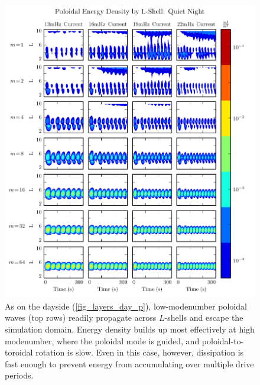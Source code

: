 \begin{figure}[!htb]
  \centering
  \includegraphics[width=\textwidth]{figures/layers_night_p.pdf}
  \caption[Nightside Poloidal Energy Distribution]{
    As on the dayside (\cref{fig_layers_day_p}), low-modenumber poloidal waves
    (top rows) readily propagate across $L$-shells and escape the simulation
    domain. Energy density builds up most effectively at high modenumber, where
    the poloidal mode is guided, and poloidal-to-toroidal rotation is slow.
    Even in this case, however, dissipation is fast enough to prevent energy
    from accumulating over multiple drive periods. 
  }
  \label{fig_layers_night_p}
\end{figure}

